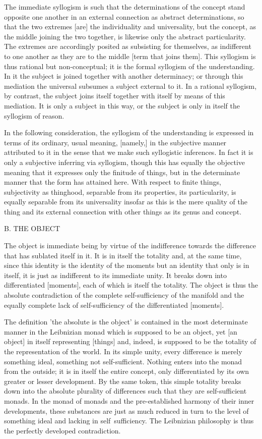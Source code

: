 The immediate syllogism is such that
the determinations of the concept stand opposite one another
in an external connection as abstract determinations,
so that the two extremes [are] the individuality and universality,
but the concept, as the middle joining the two together,
is likewise only the abstract particularity.
The extremes are accordingly posited
as subsisting for themselves,
as indifferent to one another as
they are to the middle [term that joins them].
This syllogism is thus rational but non-conceptual;
it is the formal syllogism of the understanding.
In it the subject is joined together with another determinacy;
or through this mediation the universal
subsumes a subject external to it.
In a rational syllogism, by contrast,
the subject joins itself together with itself
by means of this mediation.
It is only a subject in this way,
or the subject is only in itself
the syllogism of reason.

In the following consideration,
the syllogism of the understanding is expressed
in terms of its ordinary, usual meaning, [namely,]
in the subjective manner attributed to it
in the sense that we make such syllogistic inferences.
In fact it is only a subjective inferring via syllogism,
though this has equally the objective meaning
that it expresses only the finitude of things,
but in the determinate manner that the form has attained here.
With respect to finite things, subjectivity as thinghood,
separable from its properties, its particularity, is
equally separable from its universality insofar as this is
the mere quality of the thing
and its external connection with other things
as its genus and concept.

B. THE OBJECT

The object is immediate being by virtue of
the indifference towards the difference
that has sublated itself in it.
It is in itself the totality
and, at the same time,
since this identity is the identity of the moments
but an identity that only is in itself,
it is just as indifferent to its immediate unity.
It breaks down into differentiated [moments],
each of which is itself the totality.
The object is thus the absolute contradiction of
the complete self-sufficiency of the manifold
and the equally complete lack of self-sufficiency
of the differentiated [moments].

The definition 'the absolute is the object'
is contained in the most determinate manner
in the Leibnizian monad which is supposed to be an object,
yet [an object] in itself representing [things]
and, indeed, is supposed to be the totality of
the representation of the world.
In its simple unity,
every difference is merely something ideal,
something not self-sufficient.
Nothing enters into the monad from the outside;
it is in itself the entire concept,
only differentiated by its own
greater or lesser development.
By the same token, this simple totality breaks down
into the absolute plurality of differences such
that they are self-sufficient monads.
In the monad of monads and the pre-established harmony
of their inner developments,
these substances are just as much reduced in turn
to the level of something ideal
and lacking in self~sufficiency.
The Leibnizian philosophy is thus
the perfectly developed contradiction.

